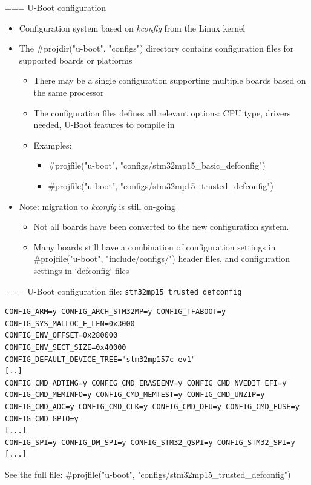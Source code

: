 === {U-Boot configuration}
  \begin{itemize}
  \item Configuration system based on {\em kconfig} from the Linux
    kernel
  \item The #projdir("u-boot", "configs") directory contains configuration
    files for supported boards or platforms
    \begin{itemize}
    \item There may be a single configuration supporting multiple
      boards based on the same processor
    \item The configuration files defines all relevant options: CPU
      type, drivers needed, U-Boot features to compile in
    \item Examples:
      \begin{itemize}
      \item #projfile("u-boot", "configs/stm32mp15_basic_defconfig")
      \item #projfile("u-boot", "configs/stm32mp15_trusted_defconfig")
      \end{itemize}
    \end{itemize}
  \item Note: migration to {\em kconfig} is still on-going
    \begin{itemize}
    \item Not all boards have been converted to the new configuration
      system.
    \item Many boards still have a combination of configuration
      settings in #projfile("u-boot", "include/configs/") header files,
      and configuration settings in `defconfig` files
    \end{itemize}
  \end{itemize}


=== U-Boot configuration file: {\tt stm32mp15\_trusted\_defconfig}
  \begin{block}{}
    {\tiny
\begin{verbatim}
CONFIG_ARM=y CONFIG_ARCH_STM32MP=y CONFIG_TFABOOT=y CONFIG_SYS_MALLOC_F_LEN=0x3000
CONFIG_ENV_OFFSET=0x280000
CONFIG_ENV_SECT_SIZE=0x40000
CONFIG_DEFAULT_DEVICE_TREE="stm32mp157c-ev1"
[..]
CONFIG_CMD_ADTIMG=y CONFIG_CMD_ERASEENV=y CONFIG_CMD_NVEDIT_EFI=y CONFIG_CMD_MEMINFO=y CONFIG_CMD_MEMTEST=y CONFIG_CMD_UNZIP=y CONFIG_CMD_ADC=y CONFIG_CMD_CLK=y CONFIG_CMD_DFU=y CONFIG_CMD_FUSE=y CONFIG_CMD_GPIO=y
[...]
CONFIG_SPI=y CONFIG_DM_SPI=y CONFIG_STM32_QSPI=y CONFIG_STM32_SPI=y
[...]
\end{verbatim}
    }
  \end{block}
  See the full file: #projfile("u-boot", "configs/stm32mp15_trusted_defconfig")


